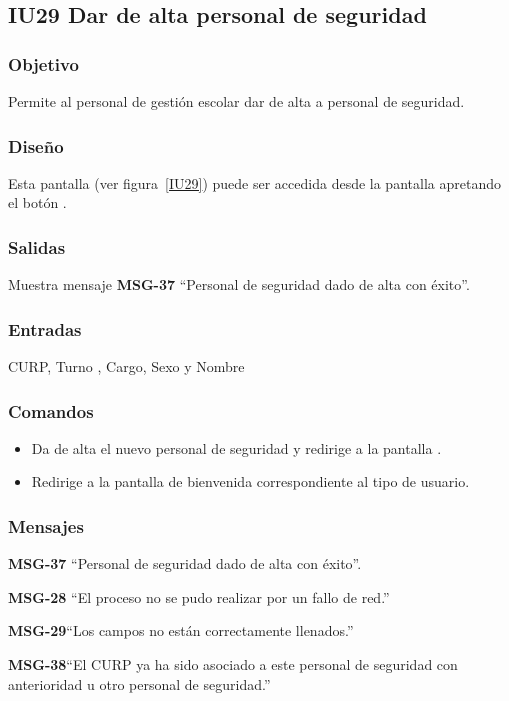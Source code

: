 
\subsection{IU29 Dar de alta personal de seguridad}
\subsubsection{Objetivo}
    Permite al personal de gestión escolar dar de alta a personal de seguridad.
\subsubsection{Diseño}
    Esta pantalla  (ver figura~\ref{IU29}) puede ser accedida desde la pantalla  apretando el botón .

\subsubsection{Salidas}
Muestra mensaje {\bf MSG-37} ``Personal de seguridad dado de alta con éxito''.
\subsubsection{Entradas}
CURP, Turno , Cargo, Sexo y Nombre
\subsubsection{Comandos}
\begin{itemize}
    \item {} Da de alta el nuevo personal de seguridad y redirige a la pantalla .
    \item {} Redirige a la pantalla de bienvenida correspondiente al tipo de usuario.
    
\end{itemize}

\subsubsection{Mensajes}

\begin{Citemize}
    \item {\bf MSG-37} ``Personal de seguridad dado de alta con éxito''.
    \item {\bf MSG-28}  ``El proceso no se pudo realizar por un fallo de red.''
    \item {\bf MSG-29}{``Los campos no están correctamente llenados.''}
    \item {\bf MSG-38}{``El CURP ya ha sido asociado a este personal de seguridad con anterioridad u otro personal de seguridad.''}
    
\end{Citemize}
